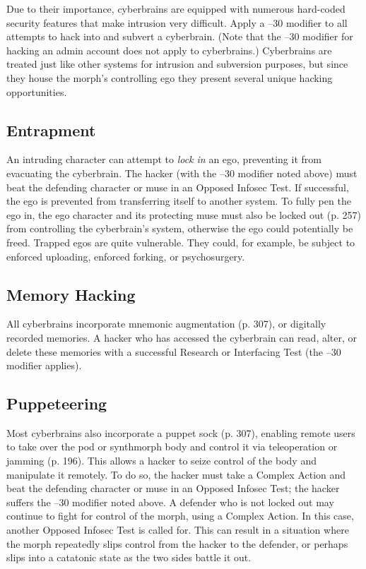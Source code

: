 Due to their importance, cyberbrains are equipped with numerous hard-coded security features that make intrusion very difficult. Apply a –30 modifier to all attempts to hack into and subvert a cyberbrain. (Note that the –30 modifier for hacking an admin account does not apply to cyberbrains.) Cyberbrains are treated just like other systems for intrusion and subversion purposes, but since they house the morph's controlling ego they present several unique hacking opportunities. 

\subsection{Entrapment} 

An intruding character can attempt to \textit{lock in} an ego, preventing it from evacuating the cyberbrain. The hacker (with the –30 modifier noted above) must beat the defending character or muse in an Opposed Infosec Test. If successful, the ego is prevented from transferring itself to another system. To fully pen the ego in, the ego character and its protecting muse must also be locked out (p. 257) from controlling the cyberbrain's system, otherwise the ego could potentially be freed. Trapped egos are quite vulnerable. They could, for example, be subject to enforced uploading, enforced forking, or psychosurgery. 

\subsection{Memory Hacking} 

All cyberbrains incorporate mnemonic augmentation (p. 307), or digitally recorded memories. A hacker who has accessed the cyberbrain can read, alter, or delete these memories with a successful Research or Interfacing Test (the –30 modifier applies). 

\subsection{Puppeteering} 

Most cyberbrains also incorporate a puppet sock (p. 307), enabling remote users to take over the pod or synthmorph body and control it via teleoperation or jamming (p. 196). This allows a hacker to seize control of the body and manipulate it remotely. To do so, the hacker must take a Complex Action and beat the defending character or muse in an Opposed Infosec Test; the hacker suffers the –30 modifier noted above. A defender who is not locked out may continue to fight for control of the morph, using a Complex Action. In this case, another Opposed Infosec Test is called for. This can result in a situation where the morph repeatedly slips control from the hacker to the defender, or perhaps slips into a catatonic state as the two sides battle it out. 

